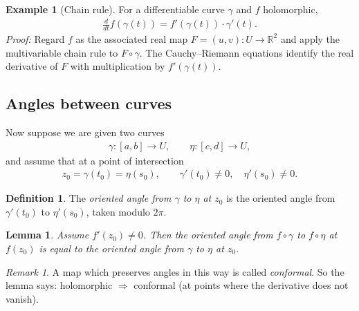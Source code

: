 \documentclass[11pt]{article}
\theoremstyle{plain}
\newtheorem{lemma}[theorem]{Lemma}
\theoremstyle{definition}
\newtheorem{definition}[theorem]{Definition}
\newtheorem{example}[theorem]{Example}
\theoremstyle{remark}
\newtheorem*{remark}{Remark}
\numberwithin{equation}{section}
\newcommand{\be}{\begin{eqnarray}}
\newcommand{\ee}{\end{eqnarray}}
\newcommand{\R}{\mathbb{R}}
\begin{document}
\begin{example}[Chain rule]
\label{ex:chain-rule}
For a differentiable curve $\gamma$ and $f$ holomorphic,
\be
 \frac{d}{dt}f(\gamma(t))=f'(\gamma(t))\cdot\gamma'(t).
\ee
\emph{Proof:} Regard $f$ as the associated real map
$F=(u,v):U\to\R^2$ and apply the multivariable chain rule to $F\circ\gamma$.
The Cauchy--Riemann equations identify the real derivative of $F$ with
multiplication by $f'(\gamma(t))$.
\end{example}

\subsection{Angles between curves}
Now suppose we are given two curves
\be
 \gamma:[a,b]\to U,\qquad \eta:[c,d]\to U,
\ee
and assume that at a point of intersection
\be
 z_0=\gamma(t_0)=\eta(s_0),
 \qquad \gamma'(t_0)\ne0,\quad \eta'(s_0)\ne0.
\ee

\begin{center}
\end{center}

\begin{definition}
The \emph{oriented angle from $\gamma$ to $\eta$ at $z_0$} is the oriented
angle from $\gamma'(t_0)$ to $\eta'(s_0)$, taken modulo $2\pi$.
\end{definition}

\begin{lemma}
\label{lem:conformal}
Assume $f'(z_0)\ne0$. Then the oriented angle from $f\circ\gamma$ to
$f\circ\eta$ at $f(z_0)$ is equal to the oriented angle from $\gamma$ to
$\eta$ at $z_0$.
\end{lemma}

\begin{remark}
A map which preserves angles in this way is called \emph{conformal}.
So the lemma says: holomorphic $\Longrightarrow$ conformal (at points where
the derivative does not vanish).
\end{remark}
\end{document}
